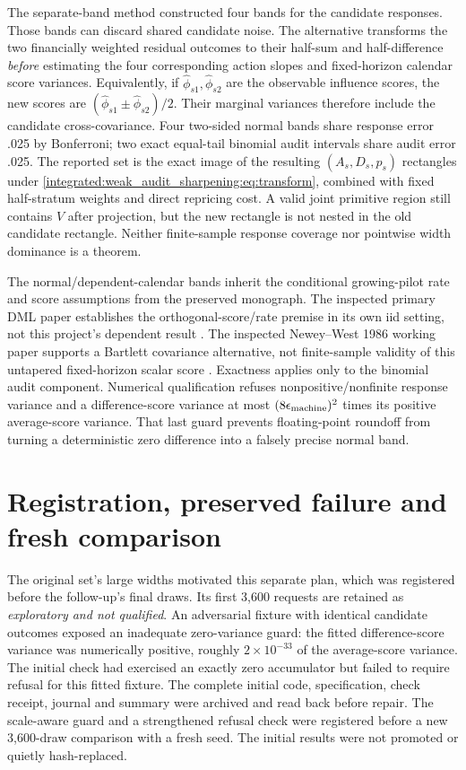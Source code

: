 The separate-band method constructed four bands for the candidate
responses. Those bands can discard shared candidate noise. The alternative transforms the two financially weighted residual outcomes to their half-sum
and half-difference \emph{before} estimating the four corresponding action
slopes and fixed-horizon calendar score variances. Equivalently, if
$\widehat\phi_{s1},\widehat\phi_{s2}$ are the observable influence scores,
the new scores are $(\widehat\phi_{s1}\pm\widehat\phi_{s2})/2$. Their marginal
variances therefore include the candidate cross-covariance. Four two-sided
normal bands share response error .025 by Bonferroni; two exact equal-tail
binomial audit intervals share audit error .025. The reported set is the exact
image of the resulting $(A_s,D_s,p_s)$ rectangles under
\eqref{integrated:weak_audit_sharpening:eq:transform}, combined with fixed half-stratum weights and direct
repricing cost. A valid joint primitive region still contains $V$ after
projection, but the new rectangle is not nested in the old candidate
rectangle. Neither finite-sample response coverage nor pointwise width
dominance is a theorem.

The normal/dependent-calendar bands inherit the conditional growing-pilot
rate and score assumptions from the preserved monograph. The inspected
primary DML paper establishes the orthogonal-score/rate premise in its own
iid setting, not this project's dependent result \cite{dml2018}. The
inspected Newey--West 1986 working paper supports a Bartlett covariance
alternative, not finite-sample validity of this untapered fixed-horizon
scalar score \cite{newey1986}. Exactness applies only to the binomial audit
component. Numerical qualification refuses nonpositive/nonfinite response
variance and a difference-score variance at most
$(8\epsilon_{\rm machine})^2$ times its positive average-score variance.
That last guard prevents floating-point roundoff from turning a deterministic
zero difference into a falsely precise normal band.

\section{Registration, preserved failure and fresh comparison}

The original set's large widths motivated this separate plan, which was
registered before the follow-up's final draws. Its first 3,600 requests are
retained as \emph{exploratory and not qualified}. An adversarial fixture with
identical candidate outcomes exposed an inadequate zero-variance guard: the
fitted difference-score variance was numerically positive, roughly
$2\times10^{-33}$ of the average-score variance. The initial check had
exercised an exactly zero accumulator but failed to require refusal for this
fitted fixture. The complete initial code, specification, check receipt,
journal and summary were archived and read back before repair. The scale-aware
guard and a strengthened refusal check were registered before a new 3,600-draw
comparison with a fresh seed. The initial results were not promoted or
quietly hash-replaced.

